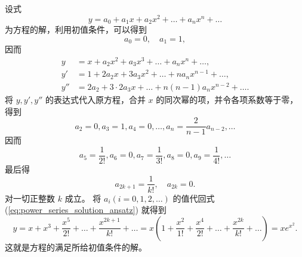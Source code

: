 \begin{solution}
    设式 \begin{equation}
y=a_0+a_1x+a_2x^2+\dots+a_nx^n+\dots \label{eq:power_series_solution_ansatz}
\end{equation}为方程的解，利用初值条件，可以得到
$$a_0=0, \quad a_1=1,$$
因而
\begin{align*}
y&=x+a_2x^2+a_3x^3+\dots+a_nx^n+\dots, \\
y'&=1+2a_2x+3a_3x^2+\dots+na_nx^{n-1}+\dots, \\
y''&=2a_2+3 \cdot 2a_3x+\dots+n(n-1)a_nx^{n-2}+\dots.
\end{align*}
将 $y,y',y''$ 的表达式代入原方程，合并 $x$ 的同次幂的项，并令各项系数等于零，得到
$$a_2=0, a_3=1, a_4=0,\dots, a_n=\frac{2}{n-1}a_{n-2}, \dots$$
因而
$$a_5=\frac{1}{2!}, a_6=0, a_7=\frac{1}{3!}, a_8=0, a_9=\frac{1}{4!}, \dots$$
最后得
$$a_{2k+1} = \frac{1}{k!}, \quad a_{2k}=0.$$
对一切正整数 $k$ 成立。
将 $a_i (i=0,1,2,\dots)$ 的值代回式 (\ref{eq:power_series_solution_ansatz}) 就得到
$$y=x+x^3+\frac{x^5}{2!}+\dots+\frac{x^{2k+1}}{k!}+\dots = x\left(1+\frac{x^2}{1!}+\frac{x^4}{2!}+\dots+\frac{x^{2k}}{k!}+\dots\right) = xe^{x^2}.$$
这就是方程的满足所给初值条件的解。
\end{solution}
